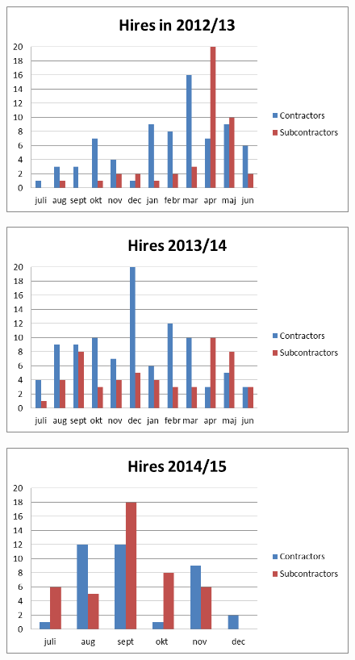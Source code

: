 \label{app:recruitment_data}
\begin{figure}[htp]
\centering
\includegraphics[scale=0.60]{appendix/hires_2012_13.png}
\end{figure}
\begin{figure}[htp]
\centering
\includegraphics[scale=0.60]{appendix/hires_2013_14.png}
\end{figure}
\begin{figure}[htp]
\centering
\includegraphics[scale=0.60]{appendix/hires_2014_15.png}
\end{figure}
